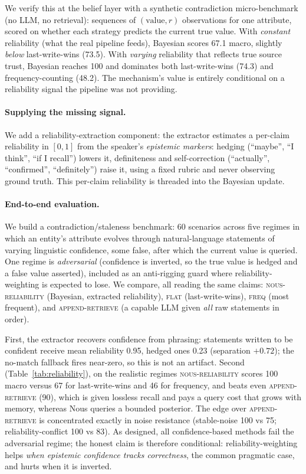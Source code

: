 \documentclass[11pt,a4paper,twocolumn]{article}
\begin{document}
We verify this at the belief layer with a synthetic contradiction
micro-benchmark (no LLM, no retrieval): sequences of $(\text{value}, r)$
observations for one attribute, scored on whether each strategy predicts the
current true value. With \emph{constant} reliability (what the real pipeline
feeds), Bayesian scores 67.1 macro, slightly \emph{below} last-write-wins
(73.5). With \emph{varying} reliability that reflects true source trust,
Bayesian reaches 100 and dominates both last-write-wins (74.3) and
frequency-counting (48.2). The mechanism's value is entirely conditional on a
reliability signal the pipeline was not providing.

\paragraph{Supplying the missing signal.}
We add a reliability-extraction component: the extractor estimates a per-claim
reliability in $[0,1]$ from the speaker's \emph{epistemic markers}: hedging
(``maybe'', ``I think'', ``if I recall'') lowers it, definiteness and
self-correction (``actually'', ``confirmed'', ``definitely'') raise it, using a
fixed rubric and never observing ground truth. This per-claim reliability is
threaded into the Bayesian update.

\paragraph{End-to-end evaluation.}
We build a contradiction/staleness benchmark: 60 scenarios across five regimes
in which an entity's attribute evolves through natural-language statements of
varying linguistic confidence, some false, after which the current value is
queried. One regime is \emph{adversarial} (confidence is inverted, so the true
value is hedged and a false value asserted), included as an anti-rigging guard
where reliability-weighting is expected to lose. We compare, all reading the
same claims: \textsc{nous-reliability} (Bayesian, extracted reliability),
\textsc{flat} (last-write-wins), \textsc{freq} (most frequent), and
\textsc{append-retrieve} (a capable LLM given \emph{all} raw statements in order).

First, the extractor recovers confidence from phrasing: statements written to be
confident receive mean reliability 0.95, hedged ones 0.23 (separation $+0.72$);
the no-match fallback fires near-zero, so this is not an artifact. Second
(Table~\ref{tab:reliability}), on the realistic regimes \textsc{nous-reliability}
scores 100 macro versus 67 for last-write-wins and 46 for frequency, and beats
even \textsc{append-retrieve} (90), which is given lossless recall and pays a
query cost that grows with memory, whereas Nous queries a bounded posterior. The
edge over \textsc{append-retrieve} is concentrated exactly in noise resistance
(stable-noise 100 vs 75; reliability-conflict 100 vs 83). As designed, all
confidence-based methods fail the adversarial regime; the honest claim is
therefore conditional: reliability-weighting helps \emph{when epistemic
confidence tracks correctness}, the common pragmatic case, and hurts when it is
inverted.
\end{document}
